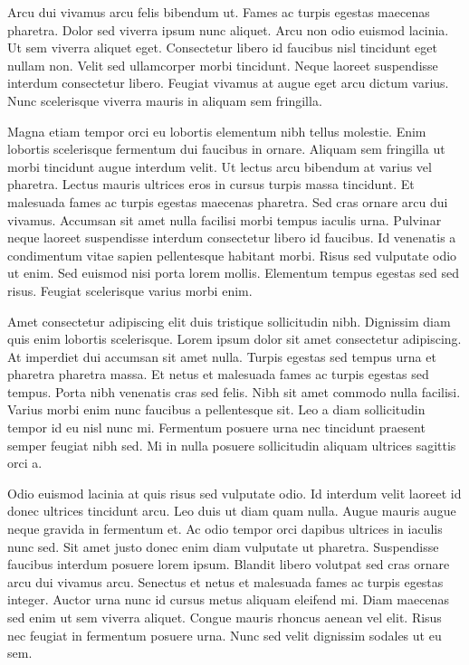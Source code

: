 \documentclass[12pt]{article}
\begin{document}
		Arcu dui vivamus arcu felis bibendum ut. Fames ac turpis egestas maecenas pharetra. Dolor sed viverra ipsum nunc aliquet. Arcu non odio euismod lacinia. Ut sem viverra aliquet eget. Consectetur libero id faucibus nisl tincidunt eget nullam non. Velit sed ullamcorper morbi tincidunt. Neque laoreet suspendisse interdum consectetur libero. Feugiat vivamus at augue eget arcu dictum varius. Nunc scelerisque viverra mauris in aliquam sem fringilla.
		
		Magna etiam tempor orci eu lobortis elementum nibh tellus molestie. Enim lobortis scelerisque fermentum dui faucibus in ornare. Aliquam sem fringilla ut morbi tincidunt augue interdum velit. Ut lectus arcu bibendum at varius vel pharetra. Lectus mauris ultrices eros in cursus turpis massa tincidunt. Et malesuada fames ac turpis egestas maecenas pharetra. Sed cras ornare arcu dui vivamus. Accumsan sit amet nulla facilisi morbi tempus iaculis urna. Pulvinar neque laoreet suspendisse interdum consectetur libero id faucibus. Id venenatis a condimentum vitae sapien pellentesque habitant morbi. Risus sed vulputate odio ut enim. Sed euismod nisi porta lorem mollis. Elementum tempus egestas sed sed risus. Feugiat scelerisque varius morbi enim.
		
		Amet consectetur adipiscing elit duis tristique sollicitudin nibh. Dignissim diam quis enim lobortis scelerisque. Lorem ipsum dolor sit amet consectetur adipiscing. At imperdiet dui accumsan sit amet nulla. Turpis egestas sed tempus urna et pharetra pharetra massa. Et netus et malesuada fames ac turpis egestas sed tempus. Porta nibh venenatis cras sed felis. Nibh sit amet commodo nulla facilisi. Varius morbi enim nunc faucibus a pellentesque sit. Leo a diam sollicitudin tempor id eu nisl nunc mi. Fermentum posuere urna nec tincidunt praesent semper feugiat nibh sed. Mi in nulla posuere sollicitudin aliquam ultrices sagittis orci a.
		
		Odio euismod lacinia at quis risus sed vulputate odio. Id interdum velit laoreet id donec ultrices tincidunt arcu. Leo duis ut diam quam nulla. Augue mauris augue neque gravida in fermentum et. Ac odio tempor orci dapibus ultrices in iaculis nunc sed. Sit amet justo donec enim diam vulputate ut pharetra. Suspendisse faucibus interdum posuere lorem ipsum. Blandit libero volutpat sed cras ornare arcu dui vivamus arcu. Senectus et netus et malesuada fames ac turpis egestas integer. Auctor urna nunc id cursus metus aliquam eleifend mi. Diam maecenas sed enim ut sem viverra aliquet. Congue mauris rhoncus aenean vel elit. Risus nec feugiat in fermentum posuere urna. Nunc sed velit dignissim sodales ut eu sem.
	
	\nocite{alchemist_pauloc} %
\end{document}
